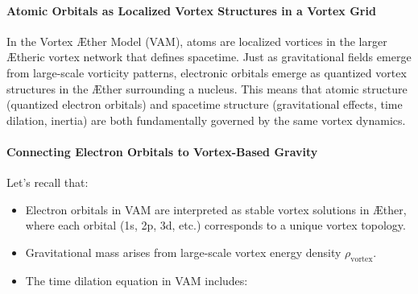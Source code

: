 \paragraph{Atomic Orbitals as Localized Vortex Structures in a Vortex Grid}
In the Vortex \AE ther Model (VAM), atoms are localized vortices in the larger \AE theric vortex network that defines spacetime.
Just as gravitational fields emerge from large-scale vorticity patterns, electronic orbitals emerge as quantized vortex structures in the \AE ther surrounding a nucleus.
This means that atomic structure (quantized electron orbitals) and spacetime structure (gravitational effects, time dilation, inertia) are both fundamentally governed by the same vortex dynamics.

\paragraph{Connecting Electron Orbitals to Vortex-Based Gravity}
Let’s recall that:
\begin{itemize}
    \item Electron orbitals in VAM are interpreted as stable vortex solutions in \AE ther, where each orbital (1s, 2p, 3d, etc.) corresponds to a unique vortex topology.
    \item Gravitational mass arises from large-scale vortex energy density $\rho_{\text{vortex}}$.
    \item The time dilation equation in VAM includes:
\end{itemize}

